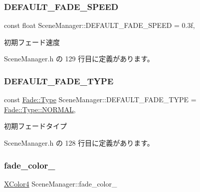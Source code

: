 \subsubsection{\texorpdfstring{D\+E\+F\+A\+U\+L\+T\+\_\+\+F\+A\+D\+E\+\_\+\+S\+P\+E\+ED}{DEFAULT\_FADE\_SPEED}}
{\footnotesize\ttfamily const float Scene\+Manager\+::\+D\+E\+F\+A\+U\+L\+T\+\_\+\+F\+A\+D\+E\+\_\+\+S\+P\+E\+ED = 0.\+3f\hspace{0.3cm}{\ttfamily [static]}, {\ttfamily [private]}}



初期フェード速度 



 Scene\+Manager.\+h の 129 行目に定義があります。

\mbox{\label{class_scene_manager_ab87f30ef7e11305bb4e3400b41225c22}} 
\subsubsection{\texorpdfstring{D\+E\+F\+A\+U\+L\+T\+\_\+\+F\+A\+D\+E\+\_\+\+T\+Y\+PE}{DEFAULT\_FADE\_TYPE}}
{\footnotesize\ttfamily const \mbox{\hyperlink{class_fade_ac06f27215b454aa05b93c236476d6e80}{Fade\+::\+Type}} Scene\+Manager\+::\+D\+E\+F\+A\+U\+L\+T\+\_\+\+F\+A\+D\+E\+\_\+\+T\+Y\+PE = \mbox{\hyperlink{class_fade_ac06f27215b454aa05b93c236476d6e80a1e23852820b9154316c7c06e2b7ba051}{Fade\+::\+Type\+::\+N\+O\+R\+M\+AL}}\hspace{0.3cm}{\ttfamily [static]}, {\ttfamily [private]}}



初期フェードタイプ 



 Scene\+Manager.\+h の 128 行目に定義があります。

\mbox{\label{class_scene_manager_a978b815258c4591f81a16995484fe9fb}} 
\subsubsection{\texorpdfstring{fade\+\_\+color\+\_\+}{fade\_color\_}}
{\footnotesize\ttfamily \mbox{\hyperlink{_vector3_d_8h_a680c30c4a07d86fe763c7e01169cd6cc}{X\+Color4}} Scene\+Manager\+::fade\+\_\+color\+\_\+\hspace{0.3cm}{\ttfamily [private]}}




